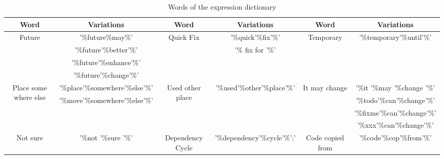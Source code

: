 \begin{table*}
\begin{center}
		\caption{Words of the expression dictionary }
		\label{tab:dictionaryExpressionW}
	\begin{tabular}{ |c|c|c|c|c|c| }
		\hline
		Word                                      &           Variations            &             Word             &     Variations     &             Word             &        Variations        \\ \hline
		\multirow{4}{4em}{Future}                 &        '\%future\%may\%'        & \multirow{4}{5em}{Quick Fix} & '\%quick'\%fix'\%' & \multirow{4}{5em}{Temporary} & '\%temporary'\%until'\%' \\
		                                          &     '\%future'\%better'\%'      &                              &  '\% fix for '\%'  &                              &  \\
		                                          &     '\%future'\%enhance'\%'     &                              &                    &                              &  \\
		                                          &     '\%future'\%change'\%'      &                              &                    &                              &  \\ \hline
		\multirow{4}{4em}{Place  some where else} & '\%place'\%somewhere'\%else'\%' & \multirow{4}{5em}{Used other place} & '\%used'\%other'\%place'\%' & \multirow{4}{5em}{It may change} & '\%it '\%may '\%change '\%'  \\
		                                          & '\%move'\%somewhere'\%else'\%'  &                              &   &                              & '\%todo'\%can'\%change'\%' \\
		                                          &                                 &                              &                    &                              & '\%fixme'\%can'\%change'\%' \\
		                                          &                                 &                              &                    &                              & '\%xxx'\%can'\%change'\%' \\
		                                           \hline
		\multirow{4}{4em}{Not sure}                 &        '\%not '\%sure '\%'        & \multirow{4}{5em}{Dependency Cycle} & '\%dependency'\%cycle'\%';' & \multirow{4}{5em}{Code copied from } & '\%code'\%cop'\%from'\%' \\

\end{tabular}
\end{center}
\end{table*}
